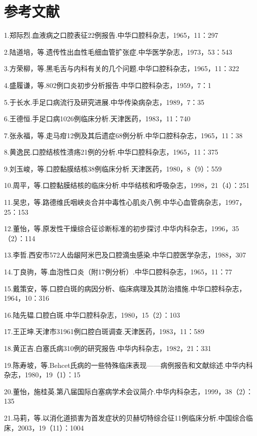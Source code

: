 \protect\hypertarget{text00153.html}{}{}

\section{参考文献}

1.郑际烈.血液病之口腔表征22例报告.中华口腔科杂志，1965，11：297

2.陆道培，等.遗传性出血性毛细血管扩张症.中华医学杂志，1973，53：543

3.方荣柳，等.黑毛舌与内科有关的几个问题.中华口腔科杂志，1965，11：322

4.盛履谦，等.802例口炎初步分析报告.中华口腔科杂志，1959，7：1

5.于长水.手足口病流行及研究进展.中华传染病杂志，1989，7：35

6.王德恒.手足口病1026例临床分析.天津医药，1983，11：740

7.张永福，等.走马疳12例及其后遗症68例分析.中华口腔科杂志，1965，11：38

8.黄逸民.口腔结核性溃疡21例的分析.中华口腔科杂志，1965，11：375

9.刘玉峻，等.口腔黏膜结核38例临床分析.天津医药，1980，8（9）：559

10.周平，等.口腔黏膜结核的临床分析.中华结核和呼吸杂志，1998，21（4）：251

11.吴忠，等.路德维氏咽峡炎合并中毒性心肌炎八例.中华心血管病杂志，1997，25：153

12.董怡，等.原发性干燥综合征诊断标准的初步探讨.中华内科杂志，1996，35（2）：114

13.李哲.西安市572人齿龈阿米巴及口腔滴虫感染.中华口腔医学杂志，1988，307

14.丁良驹，等.血泡性口炎（附17例分析）.中华口腔科杂志，1965，11：77

15.戴策安，等.口腔白斑的病因分析、临床病理及其防治措施.中华口腔科杂志，1964，10：316

16.陆先韫.口腔白斑.中华口腔科杂志，1980，15（2）：103

17.王正坤.天津市31961例口腔白斑调查.天津医药，1983，11：589

18.黄正吉.白塞氏病310例的研究报告.中华内科杂志，1982，21：331

19.陈寿坡，等.Behcet氏病的一些特殊临床表现------病例报告和文献综述.中华内科杂志，1980，19（1）：15

20.董怡，施桂英.第八届国际白塞病学术会议简介.中华内科杂志，1999，38（2）：135

21.马莉，等.以消化道损害为首发症状的贝赫切特综合征11例临床分析.中国综合临床，2003，19（11）：1004

